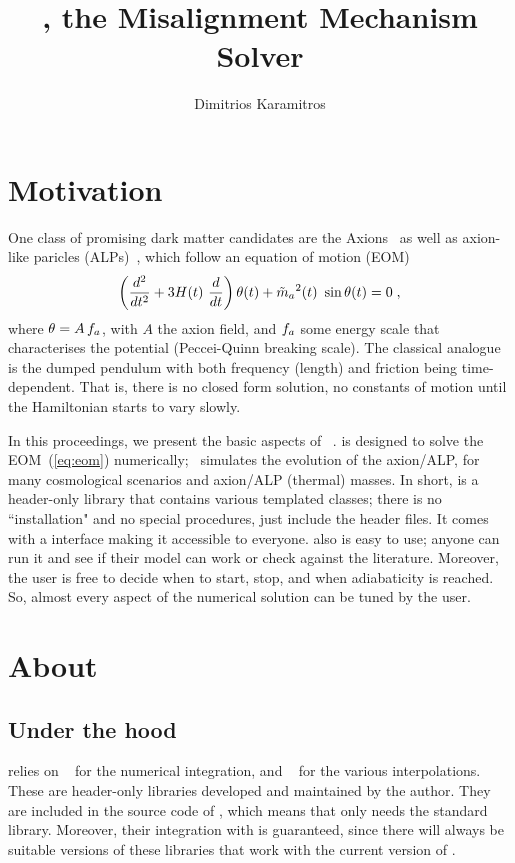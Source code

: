 \documentclass[a4paper,11pt]{article}
\title{\mimes, the Misalignment Mechanism Solver}
\author{Dimitrios Karamitros}
\affiliation{School of Physics and Astronomy, The University of Manchester,\\ Manchester M13 9PL,
	United Kingdom}
\begin{document}
\maketitle


\section{Motivation}
	One class of promising dark matter candidates are the Axions~\cite{Peccei:1977hh,Weinberg:1977ma,Wilczek:1977pj,Preskill:1982cy,Dine:1982ah,Abbott:1982af,Berezhiani:1989fp,Berezhiani:1992rk,Sakharov:1994id,Sakharov:1996xg,Khlopov:1999tm} as well as axion-like paricles (ALPs)~\cite{Chikashige:1980ui,Georgi:1981pu,Ringwald:2014vqa}, which follow an equation of motion (EOM)
	\begin{equation}
		\left( \dfrac{d^2}{d t^2} + 3 H(t) \ \dfrac{d}{d t}  \right) \theta(t) + \tilde m_{a}{}^2(t) \ \sin \theta(t) = 0 \; ,
		\label{eq:eom}
	\end{equation}	
	where $\theta= A \, f_{a}{}$, with $A$ the axion field, and $f_{a}{}$ some energy scale that characterises the potential (Peccei-Quinn breaking scale). 
	The classical analogue is the dumped pendulum with both frequency (length) and friction being time-dependent. That is, there is no closed form solution, 
	no constants of motion until the Hamiltonian starts to vary slowly. 
	
	
	In this proceedings, we present the basic aspects of \mimes~\cite{Karamitros:2021nxi}. \mimes is designed to solve the EOM~(\ref{eq:eom}) numerically; \ie~\mimes simulates the evolution of the axion/ALP, for many cosmological scenarios and axion/ALP (thermal) masses. In short, \mimes is a \CPP header-only library that contains various templated classes; there is no ``installation" and no special procedures, just include the header files. It comes with a \PY interface making it accessible to everyone. \mimes also is easy to use; anyone can run it and see if their model can work or check against the literature. Moreover, the user is 
	free to decide when to start, stop, and when adiabaticity is reached. So, almost every aspect of the numerical solution can be tuned by the user.	

	

\section{About \mimes}
	\subsection{Under the hood}
	\mimes relies on ~\cite{NaBBODES} for the numerical integration, and ~\cite{SimpleSplines} for the various interpolations. 
	These are header-only libraries developed and maintained by the author. They are included in the source code of \mimes, which means that \mimes only needs the standard \CPP library.
	Moreover, their integration with \mimes is guaranteed, since there will always be suitable versions of these libraries that work with the current version of   \mimes.
	
\end{document}

